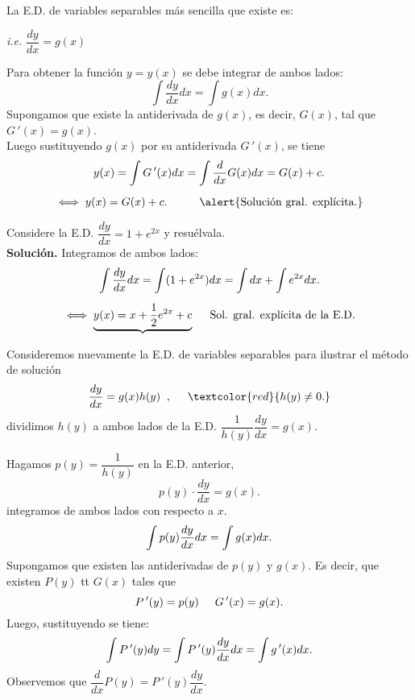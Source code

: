 \documentclass{beamer}
\begin{document}
\begin{frame}[t]
	\begin{block}{\vspace*{-2ex}}
		La E.D. de variables separables más sencilla que existe es:
		\begin{center}
			\textcolor{magenta!70}{} \hspace{5mm}\textcolor{magenta!70}{\textit{i.e.} \(\dfrac{dy}{dx} =g(x)\)}
		\end{center} 
		Para obtener la función \(y=y(x)\) se debe integrar de ambos lados:
		\[
			\int \dfrac{dy}{dx} dx = \int g(x) dx.
		\]
		Supongamos que existe la antiderivada de \(g(x)\), es decir, \(G(x)\), tal que \(G \,'(x) =g(x)\).\\
		Luego sustituyendo \(g(x)\) por su antiderivada \(G \,' (x)\), se tiene
		\[
			\begin{array}{c}
				y(x) = \dis\int G \,' (x) dx = \dis\int \dfrac{d}{dx} G(x) dx = G(x) +c. \\[5mm]
				\iff y(x) =G(x) +c. \hspace{1cm}\mbox{\alert{Solución gral. explícita.}}
			\end{array}
		\]
	\end{block}
\end{frame}

\begin{frame}[t]
	\begin{example}
		Considere la E.D. \(\dfrac{dy}{dx} =1+e^{2x}\) y resuélvala. \\[2mm]
		\textbf{Solución.} Integramos de ambos lados:
		\[
			\begin{array}{c}
				\displaystyle\int \dfrac{dy}{dx} dx= \displaystyle\int (1+e^{2x}) dx = \displaystyle\int dx+ \displaystyle\int e^{2x} dx. \\[5mm]
				\iff \underbrace{y(x) = x+ \dfrac{1}{2} e^{2x} +c} \hspace{5mm} \mbox{Sol. gral. explícita de la E.D.}
			\end{array}
		\]
	\end{example}
	Consideremos nuevamente la E.D. de variables separables para ilustrar el método de solución
	\[
		\dfrac{dy}{dx} = g(x) h(y) \;\;, \hspace{5mm} \textcolor{red}{h(y) \ne 0.}
	\]
	dividimos \(h(y)\) a ambos lados de la E.D. \(\dfrac{1}{h(y)} \dfrac{dy}{dx} = g(x)\).
\end{frame}

\begin{frame}[t]
	Hagamos \(p(y) = \dfrac{1}{h(y)}\) en la E.D. anterior,
	\[
		p(y) \cdot \dfrac{dy}{dx} = g(x).
	\]
	integramos de ambos lados con respecto a \(x\).
	\[
		\displaystyle\int p(y) \dfrac{dy}{dx} dx= \displaystyle\int g(x) dx.
	\]
	Supongamos que existen las antiderivadas de \(p(y)\) y \(g(x)\). Es decir, que existen \(P(y)\) tt \(G(x)\) tales que 
	\[
		P \,' (y) =p(y) \hspace{5mm} G \,' (x) =g(x).
	\]
	Luego, sustituyendo se tiene:
	\[
		\displaystyle\int P \,' (y) dy= \displaystyle\int P \,' (y) \dfrac{dy}{dx} dx = \displaystyle\int g \,' (x) dx.
	\]
	Observemos que \(\dfrac{d}{dx} P(y) =P \,' (y) \dfrac{dy}{dx}\). \\[2mm]
\end{frame}
\end{document}
